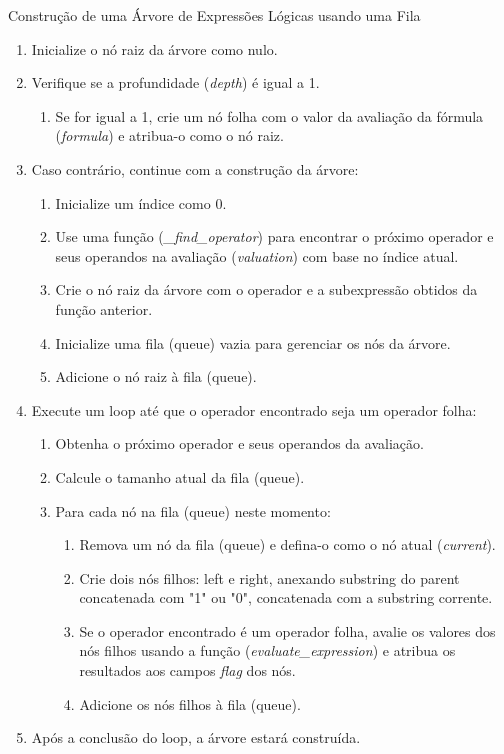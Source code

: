 \documentclass{article}
\begin{document}
\begin{adjustwidth}{1em}{1em}
\begin{algorithm}
\caption{Construção de uma Árvore de Expressões Lógicas usando uma Fila}
\begin{enumerate}
    \item Inicialize o nó raiz da árvore como nulo.
    \item Verifique se a profundidade (\textit{depth}) é igual a 1.
        \begin{enumerate}
            \item Se for igual a 1, crie um nó folha com o valor da avaliação da fórmula (\textit{formula}) e atribua-o como o nó raiz.
        \end{enumerate}
    \item Caso contrário, continue com a construção da árvore:
        \begin{enumerate}
            \item Inicialize um índice como 0.
            \item Use uma função (\textit{\_find\_operator}) para encontrar o próximo operador e seus operandos na avaliação (\textit{valuation}) com base no índice atual.
            \item Crie o nó raiz da árvore com o operador e a subexpressão obtidos da função anterior.
            \item Inicialize uma fila (queue) vazia para gerenciar os nós da árvore.
            \item Adicione o nó raiz à fila (queue).
        \end{enumerate}
    \item Execute um loop até que o operador encontrado seja um operador folha:
        \begin{enumerate}
            \item Obtenha o próximo operador e seus operandos da avaliação.
            \item Calcule o tamanho atual da fila (queue).
            \item Para cada nó na fila (queue) neste momento:
                \begin{enumerate}
                    \item Remova um nó da fila (queue) e defina-o como o nó atual (\textit{current}).
                    \item Crie dois nós filhos: left e right, anexando substring do parent concatenada com "1" ou "0", concatenada com a substring corrente.
                    \item Se o operador encontrado é um operador folha, avalie os valores dos nós filhos usando a função (\textit{evaluate\_expression}) e atribua os resultados aos campos \textit{flag} dos nós.
                    \item Adicione os nós filhos à fila (queue).
                \end{enumerate}
        \end{enumerate}
    \item Após a conclusão do loop, a árvore estará construída.
\end{enumerate}
\end{algorithm}





\end{adjustwidth}
\end{document}

